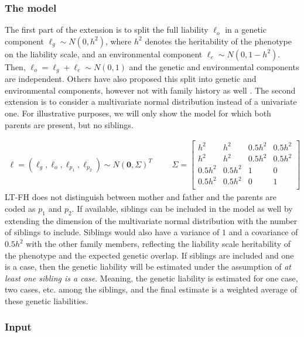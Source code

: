 \subsubsection{The model}

The first part of the extension is to split the full liability $ \ell_o $ in a genetic component $ \ell_g \sim N(0,h^2) $, where $ h^2 $ denotes the heritability of the phenotype on the liability scale, and an environmental component $ \ell_e \sim N(0, 1-h^2) $. Then, $ \ell_o = \ell_g + \ell_e \sim N(0,1) $ and the genetic and environmental components are independent. Others have also proposed this split into genetic and environmental components, however not with family history as well \cite{weissbrod2015accurate}. The second extension is to consider a multivariate normal distribution instead of a univariate one. For illustrative purposes, we will only show the model for which both parents are present, but no siblings. 

\begin{align}\label{eq:LTFH_model}
\ell = \left( \ell_g, \ell_o, \ell_{p_1}, \ell_{p_2} \right) \sim N(\mathbf{0}, \Sigma)^T & & &\Sigma = \begin{bmatrix}
h^2	&	h^2	&	0.5h^2	&	0.5h^2	\\
h^2 &	h^2 &	0.5h^2	&	0.5h^2	\\
0.5h^2	&	0.5h^2	&	1	&	0	\\
0.5h^2	&	0.5h^2	&	0	&	1	\\
\end{bmatrix}
\end{align}
LT-FH does not distinguish between mother and father and the parents are coded as $ p_1 $ and $ p_2 $. If available, siblings can be included in the model as well by extending the dimension of the multivariate normal distribution with the number of siblings to include. Siblings would also have a variance of $ 1 $ and a covariance of $ 0.5h^2 $ with the other family members, reflecting the liability scale heritability of the phenotype and the expected genetic overlap. If siblings are included and one is a case, then the genetic liability will be estimated under the assumption of \textit{at least one sibling is a case}. Meaning, the genetic liability is estimated for one case, two cases, etc. among the siblings, and the final estimate is a weighted average of these genetic liabilities.

\subsubsection{Input}

